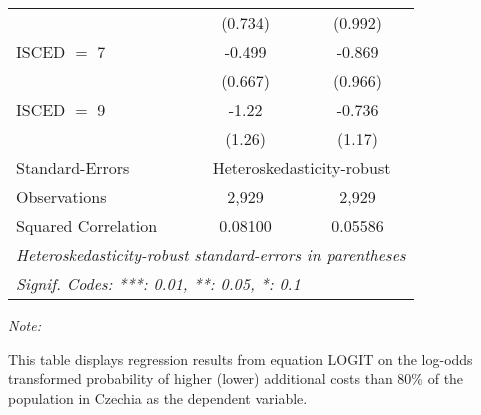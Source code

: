 \begin{table}[htbp!]
\begin{adjustbox}{width = 1\textwidth, max height = 0.95\textheight, center}
\begin{threeparttable}[b]
\begin{tabular}{lcc}
                                 & (0.734)        & (0.992)\\   
            ISCED $=$ 7          & -0.499         & -0.869\\   
                                 & (0.667)        & (0.966)\\   
            ISCED $=$ 9          & -1.22          & -0.736\\   
                                 & (1.26)         & (1.17)\\   
            \midrule 
            Standard-Errors & \multicolumn{2}{c}{Heteroskedasticity-robust} \\ 
            Observations         & 2,929          & 2,929\\  
            Squared Correlation  & 0.08100        & 0.05586\\  
            \midrule \midrule
            \multicolumn{3}{l}{\emph{Heteroskedasticity-robust standard-errors in parentheses}}\\
            \multicolumn{3}{l}{\emph{Signif. Codes: ***: 0.01, **: 0.05, *: 0.1}}\\
         \end{tabular}
         
         \begin{tablenotes}\item \medskip \textit{Note:}
            \item This table displays regression results from equation LOGIT on the log-odds transformed probability of higher (lower) additional costs than 80\% of the population in Czechia as the dependent variable. 
         \end{tablenotes}
      \end{threeparttable}
   \end{adjustbox}
\end{table}


